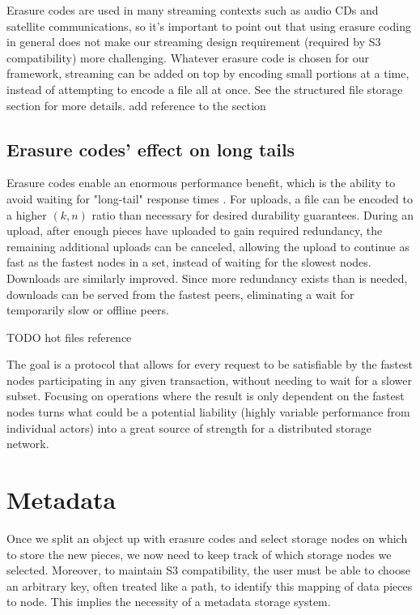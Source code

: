 \documentclass[11pt,fleqn,openany]{book}
\newcommand{\todo}[1]{{\color{red} TODO #1 }}
\newcommand{\bs}[1]{{\color{red}#1}}
\begin{document}
Erasure codes are used in many streaming contexts such as audio CDs and
satellite communications, so it's important to point out that using erasure
coding in general does not make our streaming design requirement
(required by S3 compatibility) more challenging.
Whatever erasure code is chosen for our framework, streaming can be
added on top by encoding small portions at a time, instead of attempting to
encode a file all at once. See the structured file storage section for more
details. \bs{add reference to the section}

\subsection{Erasure codes' effect on long tails}

Erasure codes enable an enormous performance benefit, which is the ability to
avoid waiting for "long-tail" response times \cite{tail-at-scale}. For uploads,
a file can be encoded to a higher $(k, n)$ ratio than necessary for desired
durability guarantees.
During an upload, after enough pieces have uploaded to gain required
redundancy, the remaining additional uploads can be canceled, allowing the
upload to continue as fast as the fastest nodes in a set, instead of waiting
for the slowest nodes.
Downloads are similarly improved. Since more redundancy exists
than is needed, downloads can be served from the fastest peers, eliminating a
wait for temporarily slow or offline peers.

\todo{hot files reference}

The goal is a protocol that allows for every request to be satisfiable by the
fastest nodes participating in any given transaction, without needing to wait
for a slower subset.
Focusing on operations where the result is only dependent on the fastest
nodes turns what could be a potential liability (highly variable performance
from individual actors) into a great source of strength for a distributed
storage network.

\section{Metadata}

Once we split an object up with erasure codes and select storage nodes on
which to store the new pieces, we now need to keep track of which storage
nodes we selected.
Moreover, to maintain S3 compatibility, the user must be able to choose an
arbitrary key, often treated like a path, to identify this mapping of data
pieces to node. This implies the necessity of a metadata storage system.
\end{document}
